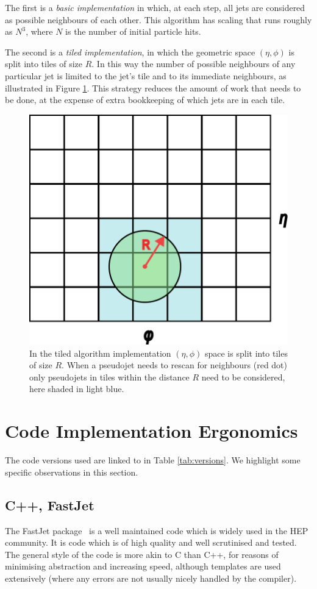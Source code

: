 \documentclass{webofc}
\begin{document}
The first is a \emph{basic implementation} in which, at each step, all jets are
considered as possible neighbours of each other. This algorithm has scaling that
runs roughly as $N^3$, where $N$ is the number of initial particle hits.

The second is a \emph{tiled implementation}, in which the geometric space
$(\eta, \phi)$ is split into tiles of size $R$. In this way the number of
possible neighbours of any particular jet is limited to the jet's tile and to
its immediate neighbours, as illustrated in Figure \ref{fig:tiledimp}. This
strategy reduces the amount of work that needs to be done, at the expense of
extra bookkeeping of which jets are in each tile.

\begin{figure}[h]
  \begin{center}
    \includegraphics[width=0.4\linewidth]{tiled-algorithm.pdf}
    \caption{In the tiled algorithm implementation $(\eta,\phi)$ space is split into tiles of size $R$. When a pseudojet needs to rescan for neighbours (red dot) only pseudojets in tiles within the distance $R$ need to be considered, here shaded in light blue.}
    \label{fig:tiledimp}
  \end{center}
\end{figure}

\section{Code Implementation Ergonomics}
\label{sec:ergonomics}

The code versions used are linked to in Table \ref{tab:versions}. We highlight
some specific observations in this section.

\subsection{C++, FastJet}
\label{sec:cpp-ergonomics}

The FastJet package~\cite{Cacciari:2011ma,fastjet-web} is a well maintained code
which is widely used in the HEP community. It is code which is of high quality
and well scrutinised and tested. The general style of the code is more akin to C
than C++, for reasons of minimising abstraction and increasing speed, although
templates are used extensively (where any errors are not usually nicely handled
by the compiler).
\end{document}
